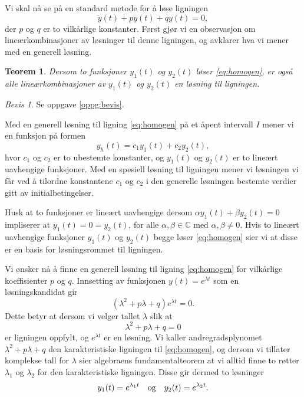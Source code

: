 \documentclass{article}
\newtheorem{thm}{Teorem}\surroundwithmdframed{thm}
\theoremstyle{definition}
\theoremstyle{remark}
\newtheorem*{bevis}{Bevis}
\newenvironment{defn}
{\pushQED{\qed}\renewcommand{\qedsymbol}{$\triangle$}\defnx}
{\popQED\enddefnx}
\begin{document}
\begin{multicols*}{2}
Vi skal nå se på en standard metode for å løse ligningen
\begin{equation} \label{eq:homogen}
    \ddot{y}(t) + p \dot{y}(t) + q y(t) = 0,
\end{equation}
der $p$ og $q$ er to vilkårlige konstanter. Først gjør vi en observasjon om lineærkombinasjoner av løsninger til denne ligningen, og avklarer hva vi mener med en generell løsning.

\begin{thm} \label{thm:lin_komb_losning}
  Dersom to funksjoner $y_1(t)$ og $y_2(t)$ løser \eqref{eq:homogen}, er også alle lineærkombinasjoner av $y_1(t)$ og $y_2(t)$ en løsning til ligningen.
\end{thm}

\begin{bevis}
  Se oppgave \ref{oppg:bevis}.
\end{bevis}

\begin{defn}
    Med en generell løsning til ligning \eqref{eq:homogen} på et åpent intervall $I$ mener vi en funksjon på formen
    \begin{equation*}
      y_h(t) = c_1 y_1(t) + c_2 y_2(t),
    \end{equation*}
    hvor $c_1$ og $c_2$ er to ubestemte konstanter, og $y_1(t)$ og $y_2(t)$ er to lineært uavhengige funksjoner. Med en spesiell løsning til ligningen mener vi løsningen vi får ved å tilordne konstantene $c_1$ og $c_2$ i den generelle løsningen bestemte verdier gitt av initialbetingelser.
\end{defn}

Husk at to funksjoner er lineært uavhengige dersom $\alpha y_1(t) + \beta y_2(t) = 0$ impliserer at $y_1(t) = 0 = y_2(t)$, for alle $\alpha, \beta \in \mathbb{C}$ med $\alpha,\beta \neq 0$. Hvis to lineært uavhengige funksjoner $y_1(t)$ og $y_2(t)$ begge løser \eqref{eq:homogen} sier vi at disse er en basis for løsningsrommet til ligningen.

Vi ønsker nå å finne en generell løsning til ligning \eqref{eq:homogen} for vilkårlige koeffisienter $p$ og $q$. Innsetting av funksjonen $y(t) = e^{\lambda t}$ som en løsningskandidat gir
\begin{equation*}
  (\lambda^2 + p \lambda + q) e^{\lambda t} = 0.
\end{equation*}
Dette betyr at dersom vi velger tallet $\lambda$ slik at
\begin{equation*}
  \lambda^2 + p \lambda + q = 0  
\end{equation*}
er ligningen oppfylt, og $e^{\lambda t}$ er en løsning. Vi kaller andregradsplynomet $\lambda^2 + p \lambda + q$ den karakteristiske ligningen til \eqref{eq:homogen}, og dersom vi tillater komplekse tall for $\lambda$ sier algebraens fundamentalteorem at vi alltid finne to røtter $\lambda_1$ og $\lambda_2$ for den karakteristiske ligningen. Disse gir dermed to løsninger
\begin{equation*}
  y_1(t) = e^{\lambda_1 t}\ \ \textnormal{ og }\ \ y_2(t) = e^{\lambda_2 t}.
\end{equation*}


\end{multicols*}
\end{document}
